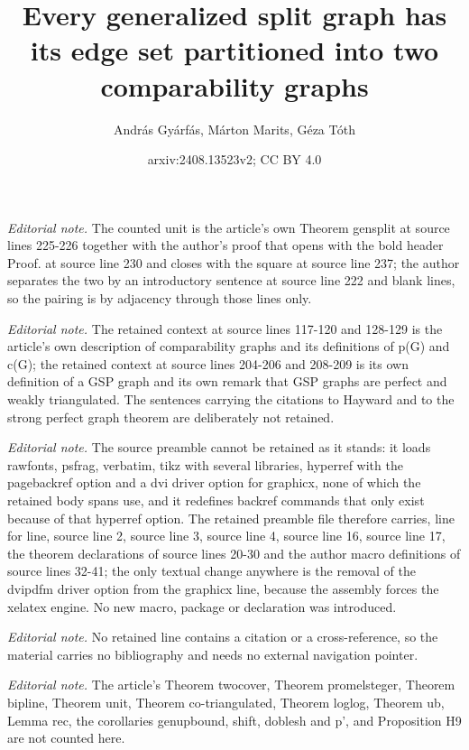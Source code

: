 \documentclass[12pt]{article}
\title{Every generalized split graph has its edge set partitioned into two comparability graphs}
\author{András Gyárfás, Márton Marits, Géza Tóth}
\date{arxiv:2408.13523v2; CC BY 4.0}
\begin{document}
\maketitle
\noindent\textit{Editorial note.} The counted unit is the article's own Theorem gensplit at source lines 225-226 together with the author's proof that opens with the bold header Proof. at source line 230 and closes with the square at source line 237; the author separates the two by an introductory sentence at source line 222 and blank lines, so the pairing is by adjacency through those lines only.\par\medskip
\noindent\textit{Editorial note.} The retained context at source lines 117-120 and 128-129 is the article's own description of comparability graphs and its definitions of p(G) and c(G); the retained context at source lines 204-206 and 208-209 is its own definition of a GSP graph and its own remark that GSP graphs are perfect and weakly triangulated. The sentences carrying the citations to Hayward and to the strong perfect graph theorem are deliberately not retained.\par\medskip
\noindent\textit{Editorial note.} The source preamble cannot be retained as it stands: it loads rawfonts, psfrag, verbatim, tikz with several libraries, hyperref with the pagebackref option and a dvi driver option for graphicx, none of which the retained body spans use, and it redefines backref commands that only exist because of that hyperref option. The retained preamble file therefore carries, line for line, source line 2, source line 3, source line 4, source line 16, source line 17, the theorem declarations of source lines 20-30 and the author macro definitions of source lines 32-41; the only textual change anywhere is the removal of the dvipdfm driver option from the graphicx line, because the assembly forces the xelatex engine. No new macro, package or declaration was introduced.\par\medskip
\noindent\textit{Editorial note.} No retained line contains a citation or a cross-reference, so the material carries no bibliography and needs no external navigation pointer.\par\medskip
\noindent\textit{Editorial note.} The article's Theorem twocover, Theorem promelsteger, Theorem bipline, Theorem unit, Theorem co-triangulated, Theorem loglog, Theorem ub, Lemma rec, the corollaries genupbound, shift, doblesh and p', and Proposition H9 are not counted here.\par\medskip
\end{document}
